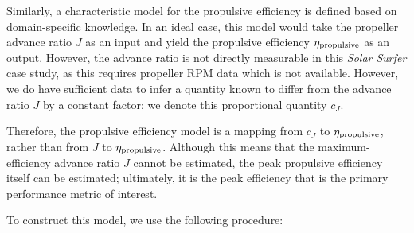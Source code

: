 Similarly, a characteristic model for the propulsive efficiency is defined based on domain-specific knowledge. In an ideal case, this model would take the propeller advance ratio $J$ as an input and yield the propulsive efficiency $\eta_{\rm propulsive}$ as an output. However, the advance ratio is not directly measurable in this \emph{Solar Surfer} case study, as this requires propeller RPM data which is not available. However, we do have sufficient data to infer a quantity known to differ from the advance ratio $J$ by a constant factor; we denote this proportional quantity $c_J$.

Therefore, the propulsive efficiency model is a mapping from $c_J$ to $\eta_{\rm propulsive}$, rather than from $J$ to $\eta_{\rm propulsive}$. Although this means that the maximum-efficiency advance ratio $J$ cannot be estimated, the peak propulsive efficiency itself can be estimated; ultimately, it is the peak efficiency that is the primary performance metric of interest.

To construct this model, we use the following procedure:

